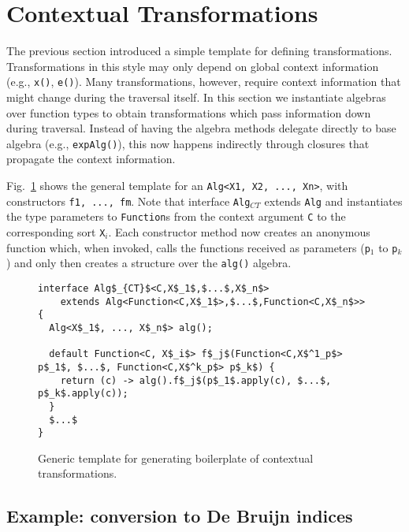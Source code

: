\section{Contextual Transformations}\label{sec:contexttrans}

The previous section introduced a simple template for defining
transformations. Transformations in this style may only depend on
global context information (e.g., \lstinline{x()}, \lstinline{e()}).
Many transformations, however, require context information that might
change during the traversal itself. In this section we instantiate
algebras over function types to obtain transformations which pass
information down during traversal. Instead of having the algebra
methods delegate directly to base algebra (e.g.,
\lstinline{expAlg()}), this now happens indirectly through closures
that propagate the context information.

Fig.~\ref{ctxTrafoTemplate} shows the general template for an \lstinline{Alg<X1, X2, ..., Xn>}, with constructors \lstinline{f1, ..., fm}.
Note that interface \lstinline{Alg}$_{CT}$ extends \lstinline{Alg} and instantiates the type parameters to \lstinline{Function}s from the context argument \lstinline{C} to the corresponding sort \lstinline{X}$_i$.
Each constructor method now creates an anonymous function which, when invoked, calls the functions received as parameters (\lstinline{p}$_1$ to \lstinline{p}$_k$) and only then creates a structure over the \lstinline{alg()} algebra.

\begin{figure}[t]
\nocaptionrule
\begin{lstlisting}[mathescape=true]
interface Alg$_{CT}$<C,X$_1$,$...$,X$_n$>
    extends Alg<Function<C,X$_1$>,$...$,Function<C,X$_n$>> {
  Alg<X$_1$, ..., X$_n$> alg();

  default Function<C, X$_i$> f$_j$(Function<C,X$^1_p$> p$_1$, $...$, Function<C,X$^k_p$> p$_k$) {
    return (c) -> alg().f$_j$(p$_1$.apply(c), $...$, p$_k$.apply(c));
  }
  $...$
}
\end{lstlisting}
\caption{Generic template for generating boilerplate of contextual transformations.}
\label{ctxTrafoTemplate}
\end{figure}

\subsection{Example: conversion to De Bruijn indices}\label{subsec:debruign_example}

